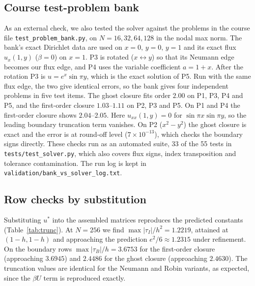 \documentclass[11pt,a4paper]{article}
\theoremstyle{palplain}
\theoremstyle{paldef}
\theoremstyle{palremark}
\begin{document}
\subsection{Course test-problem bank}
As an external check, we also tested the solver against the problems in the course
file \texttt{test\_problem\_bank.py}, on $N=16,32,64,128$ in the nodal max norm. The bank's exact
Dirichlet data are used on $x=0,\,y=0,\,y=1$ and its exact flux $u_x(1,y)$ ($\beta=0$) on $x=1$.
P3 is rotated ($x\leftrightarrow y$) so that its Neumann edge becomes our flux edge, and P4 uses
the variable coefficient $a=1+x$. After the rotation P3 is $u=e^{x}\sin\pi y$, which is the
exact solution of P5. Run with the same flux edge, the two give identical errors, so the bank
gives four independent problems in five test items. The ghost closure fits order $2.00$ on
P1, P3, P4 and P5, and the first-order closure $1.03$--$1.11$ on P2, P3 and P5. On P1 and P4 the
first-order closure shows $2.04$--$2.05$. Here $u_{xx}(1,y)=0$ for $\sin\pi x\sin\pi y$, so the
leading boundary truncation term vanishes. On P2 ($x^2-y^2$) the ghost closure is exact and the
error is at round-off level ($7\times10^{-13}$), which checks the boundary signs directly. These
checks run as an automated suite, 33 of the 55 tests in \texttt{tests/test\_solver.py}, which also
covers flux signs, index transposition and tolerance contamination. The run log is kept in
\texttt{validation/bank\_vs\_solver\_log.txt}.

\subsection{Row checks by substitution}
Substituting $u^*$ into the assembled matrices reproduces the predicted constants
(Table~\ref{tab:trunc}). At $N=256$ we find $\max|\tau_I|/h^2=1.2219$, attained at
$(1-h,1-h)$ and approaching the prediction $e^2/6\approx1.2315$ under refinement. On the
boundary rows $\max|\tau_B|/h=3.6753$ for the first-order closure (approaching $3.6945$) and
$2.4486$ for the ghost closure (approaching $2.4630$). The truncation values are identical for
the Neumann and Robin variants, as expected, since the $\beta U$ term is reproduced exactly.
\begin{table}[H]\centering\small

\caption{Robin variant, row checks. $\tau=Au^*-F$. $\eta(\cdot)=\|\cdot-\cdot^{\mathsf T}\|_F/\|\cdot\|_F$.
$D$ as in Proposition~\ref{prop:sym}; $\eta(DA)$ is exactly zero in floating point.
Equation~\eqref{eq:sres} reports componentwise backward error of the direct solve; forward
algebraic error is assessed separately in Section~\ref{sec:alg}. Source: \texttt{results/mms\_checks.csv}.}
\label{tab:trunc}
\end{table}
\end{document}
